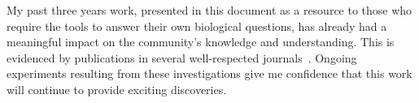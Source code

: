 
My past three years work, presented in this document as a resource to those who require the tools to answer their own biological questions, has already had a meaningful impact on the community's knowledge and understanding.
This is evidenced by publications in several well-respected journals~\cite{teplensky2017temperature, fantham2017new, moghadam2018computer, holcman2018single, lautenschlager2018c}. 
Ongoing experiments resulting from these investigations give me confidence that this work will continue to provide exciting discoveries. 

